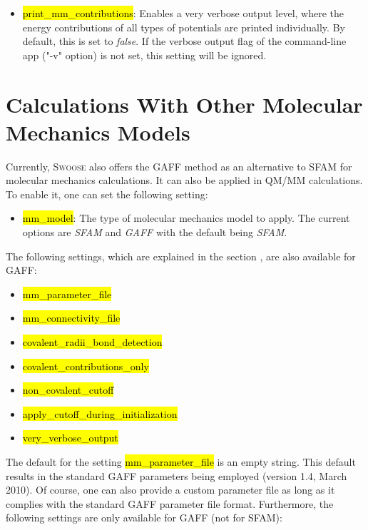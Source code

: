 \documentclass[]{tufte-book}
\begin{document}
{{\begin{itemize}
\item \hl{print\_mm\_contributions}: Enables a very verbose output level, where the energy contributions of all types of potentials are printed individually. By default, this is set to \textit{false}. If the verbose output flag of the command-line app ("-v" option) is not set, this setting will be ignored.
\end{itemize}

\chapter{Calculations With Other Molecular Mechanics Models}

Currently, \textsc{Swoose} also offers the GAFF method\cite{gaff} as an alternative to SFAM for molecular mechanics calculations. It can also be applied in QM/MM calculations. To enable it, one can set the following setting:
\begin{itemize}
\item \hl{mm\_model}: The type of molecular mechanics model to apply. The current options are \textit{SFAM} and \textit{GAFF} with the default being \textit{SFAM}.
\end{itemize}

The following settings, which are explained in the section , are also available for GAFF:

\begin{itemize}
\item \hl{mm\_parameter\_file}
\item \hl{mm\_connectivity\_file}
\item \hl{covalent\_radii\_bond\_detection}
\item \hl{covalent\_contributions\_only}
\item \hl{non\_covalent\_cutoff}
\item \hl{apply\_cutoff\_during\_initialization}
\item \hl{very\_verbose\_output}
\end{itemize}

The default for the setting \hl{mm\_parameter\_file} is an empty string. This default results in the standard GAFF parameters being employed (version 1.4, March 2010). Of course, one can also provide a custom parameter file as long as it complies with the standard GAFF parameter file format.
Furthermore, the following settings are only available for GAFF (not for SFAM):

}}
\end{document}
